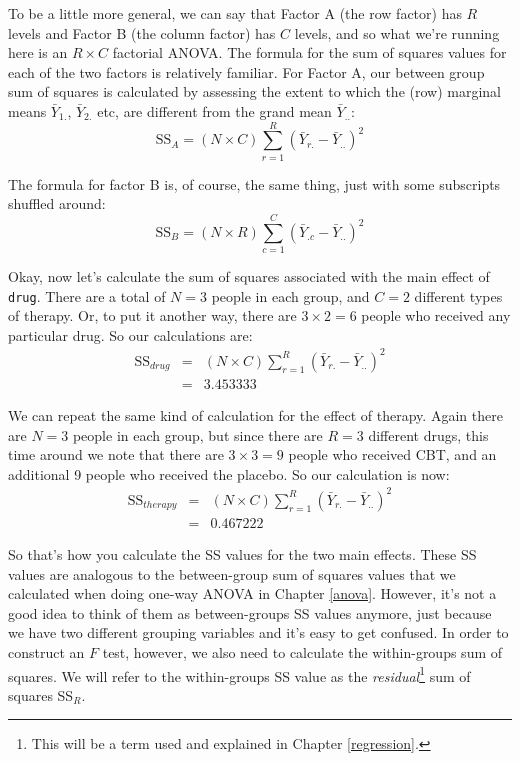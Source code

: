 \documentclass[
]{book}
\theoremstyle{definition}
\theoremstyle{definition}
\theoremstyle{definition}
\theoremstyle{definition}
\theoremstyle{remark}
\begin{document}
To be a little more general, we can say that Factor A (the row factor) has \(R\) levels and Factor B (the column factor) has \(C\) levels, and so what we're running here is an \(R \times C\) factorial ANOVA. The formula for the sum of squares values for each of the two factors is relatively familiar. For Factor A, our between group sum of squares is calculated by assessing the extent to which the (row) marginal means \(\bar{Y}_{1.}\), \(\bar{Y}_{2.}\) etc, are different from the grand mean \(\bar{Y}_{..}\):
\[
\mbox{SS}_{A} = (N \times C)  \sum_{r=1}^R  \left( \bar{Y}_{r.} - \bar{Y}_{..} \right)^2
\]

The formula for factor B is, of course, the same thing, just with some subscripts shuffled around:
\[
\mbox{SS}_{B} = (N \times R) \sum_{c=1}^C \left( \bar{Y}_{.c} - \bar{Y}_{..} \right)^2
\]

Okay, now let's calculate the sum of squares associated with the main effect of \texttt{drug}. There are a total of \(N=3\) people in each group, and \(C=2\) different types of therapy. Or, to put it another way, there are \(3 \times 2 = 6\) people who received any particular drug. So our calculations are:
\[
\begin{array}{rcl}
\mbox{SS}_{drug} &=& (N \times C)  \sum_{r=1}^R  \left( \bar{Y}_{r.} - \bar{Y}_{..} \right)^2
    \\
    &=& 3.453333
\end{array}
\]

We can repeat the same kind of calculation for the effect of therapy. Again there are \(N=3\) people in each group, but since there are \(R=3\) different drugs, this time around we note that there are \(3 \times 3 = 9\) people who received CBT, and an additional 9 people who received the placebo. So our calculation is now:
\[
\begin{array}{rcl}
\mbox{SS}_{therapy} &=& (N \times C)  \sum_{r=1}^R  \left( \bar{Y}_{r.} - \bar{Y}_{..} \right)^2
    \\
    &=& 0.467222
\end{array}
\]

So that's how you calculate the SS values for the two main effects. These SS values are analogous to the between-group sum of squares values that we calculated when doing one-way ANOVA in Chapter \ref{anova}. However, it's not a good idea to think of them as between-groups SS values anymore, just because we have two different grouping variables and it's easy to get confused. In order to construct an \(F\) test, however, we also need to calculate the within-groups sum of squares. We will refer to the within-groups SS value as the \emph{residual}\footnote{This will be a term used and explained in Chapter \ref{regression}.} sum of squares SS\(_R\).
\end{document}
